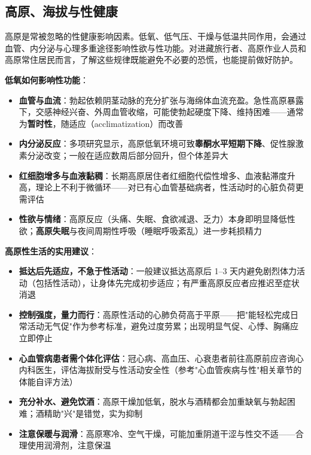 \subsection{高原、海拔与性健康}

高原是常被忽略的性健康影响因素。低氧、低气压、干燥与低温共同作用，会通过血管、内分泌与心理多重途径影响性欲与性功能。对进藏旅行者、高原作业人员和高原常住居民而言，了解这些规律既能避免不必要的恐慌，也能提前做好防护。

\vspace{0.5em}
\noindent\textbf{低氧如何影响性功能}：

\begin{itemize}
	\item \textbf{血管与血流}：勃起依赖阴茎动脉的充分扩张与海绵体血流充盈。急性高原暴露下，交感神经兴奋、外周血管收缩，可能使勃起硬度下降、维持困难——通常为\textbf{暂时性}，随适应（acclimatization）而改善
	\item \textbf{内分泌反应}：多项研究显示，高原低氧环境可致\textbf{睾酮水平短期下降}、促性腺激素分泌改变；一般在适应数周后部分回升，但个体差异大
	\item \textbf{红细胞增多与血液黏稠}：长期高原居住者红细胞代偿性增多、血液黏滞度升高，理论上不利于微循环——对已有心血管基础病者，性活动时的心脏负荷更需评估
	\item \textbf{性欲与情绪}：高原反应（头痛、失眠、食欲减退、乏力）本身即明显降低性欲；\textbf{高原失眠}与夜间周期性呼吸（睡眠呼吸紊乱）进一步耗损精力
\end{itemize}

\vspace{0.5em}
\noindent\textbf{高原性生活的实用建议}：

\begin{itemize}
	\item \textbf{抵达后先适应，不急于性活动}：一般建议抵达高原后 1--3 天内避免剧烈体力活动（包括性活动），让身体先完成初步适应；有严重高原反应者应推迟至症状消退
	\item \textbf{控制强度，量力而行}：高原性活动的心肺负荷高于平原——把"能轻松完成日常活动无气促"作为参考标准，避免过度劳累；出现明显气促、心悸、胸痛应立即停止
	\item \textbf{心血管病患者需个体化评估}：冠心病、高血压、心衰患者前往高原前应咨询心内科医生，评估海拔耐受与性活动安全性（参考"心血管疾病与性"相关章节的体能自评方法）
	\item \textbf{充分补水、避免饮酒}：高原干燥加低氧，脱水与酒精都会加重缺氧与勃起困难；酒精助"兴"是错觉，实为抑制
	\item \textbf{注意保暖与润滑}：高原寒冷、空气干燥，可能加重阴道干涩与性交不适——合理使用润滑剂，注意保温
\end{itemize}

